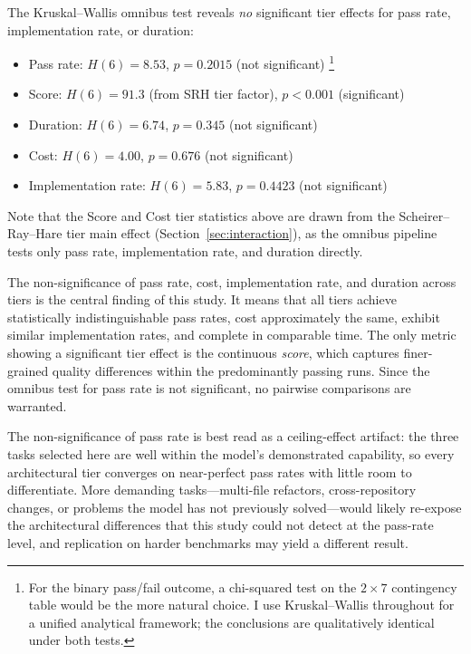 \documentclass[11pt]{article}
\begin{document}
The Kruskal--Wallis omnibus test reveals \emph{no} significant tier effects
for pass rate, implementation rate, or duration:

\begin{itemize}
  \item Pass rate: $H(6) = 8.53$, $p = 0.2015$ (not significant)%
    \footnote{For the binary pass/fail outcome, a chi-squared test on the
    $2 \times 7$ contingency table would be the more natural choice. I use
    Kruskal--Wallis throughout for a unified analytical framework; the
    conclusions are qualitatively identical under both tests.}
  \item Score: $H(6) = 91.3$ (from SRH tier factor), $p < 0.001$ (significant)
  \item Duration: $H(6) = 6.74$, $p = 0.345$ (not significant)
  \item Cost: $H(6) = 4.00$, $p = 0.676$ (not significant)
  \item Implementation rate: $H(6) = 5.83$, $p = 0.4423$ (not significant)
\end{itemize}

Note that the Score and Cost tier statistics above are drawn from the
Scheirer--Ray--Hare tier main effect (Section~\ref{sec:interaction}), as the
omnibus pipeline tests only pass rate, implementation rate, and duration
directly.

The non-significance of pass rate, cost, implementation rate, and duration
across tiers is the central finding of this study. It means that all tiers
achieve statistically indistinguishable pass rates, cost approximately the
same, exhibit similar implementation rates, and complete in comparable time.
The only metric showing a significant tier effect is the continuous
\emph{score}, which captures finer-grained quality differences within the
predominantly passing runs. Since the omnibus test for pass rate is not
significant, no pairwise comparisons are warranted.

The non-significance of pass rate is best read as a ceiling-effect artifact:
the three tasks selected here are well within the model's demonstrated
capability, so every architectural tier converges on near-perfect pass rates
with little room to differentiate. More demanding tasks---multi-file
refactors, cross-repository changes, or problems the model has not previously
solved---would likely re-expose the architectural differences that this study
could not detect at the pass-rate level, and replication on harder benchmarks
may yield a different result.
\end{document}
